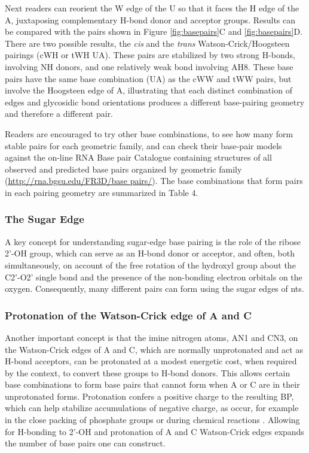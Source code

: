 Next readers can reorient the W edge of the U so that it faces the H edge of the
A, juxtaposing complementary H-bond donor and acceptor groups. Results can be
compared with the pairs shown in Figure \ref{fig:basepairs}C and
\ref{fig:basepairs}D. There are two possible results, the \emph{cis} and the
\emph{trans} Watson-Crick/Hoogsteen pairings (cWH or tWH UA). These pairs are
stabilized by two strong H-bonds, involving NH donors, and one relatively weak
bond involving AH8. These base pairs have the same base combination (UA) as the
cWW and tWW pairs, but involve the Hoogsteen edge of A, illustrating that each
distinct combination of edges and glycosidic bond orientations produces a
different base-pairing geometry and therefore a different pair. 

Readers are encouraged to try other base combinations, to see how many form
stable pairs for each geometric family, and can check their base-pair models
against the on-line RNA Base pair Catalogue containing structures of all
observed and predicted base pairs organized by geometric family
(\url{http://rna.bgsu.edu/FR3D/base pairs/}). The base combinations that form
pairs in each pairing geometry are summarized in Table 4.

\subsubsection{The Sugar Edge}

A key concept for understanding sugar-edge base pairing is the role of the
ribose 2’-OH group, which can serve as an H-bond donor or acceptor, and often,
both simultaneously, on account of the free rotation of the hydroxyl group about
the C2’-O2’ single bond and the presence of the non-bonding electron orbitals on
the oxygen. Consequently, many different pairs can form using the sugar edges of
nts.  

\subsubsection{Protonation of the Watson-Crick edge of A and C}

Another important concept is that the imine nitrogen atoms, AN1 and CN3, on the
Watson-Crick edges of A and C, which are normally unprotonated and act as H-bond
acceptors, can be protonated at a modest energetic cost, when required by the
context, to convert these groups to H-bond donors. This allows certain base
combinations to form base pairs that cannot form when A or C are in their
unprotonated forms. Protonation confers a positive charge to the resulting BP,
which can help stabilize accumulations of negative charge, as occur, for example
in the close packing of phosphate groups or during chemical reactions
\cite{Siegfried2010, Cerrone-Szakal2008a}. Allowing for H-bonding to 2'-OH and
protonation of A and C Watson-Crick edges expands the number of base pairs one
can construct. 


